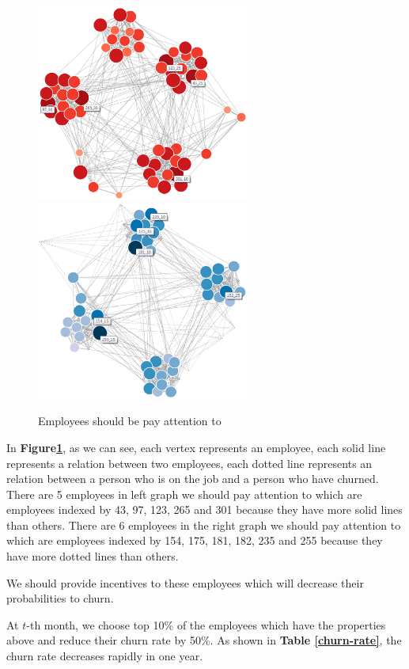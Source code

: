 \documentclass[12pt,a4paper,titlepage]{article}
\begin{document}
\begin{figure}[htb]
  \centering
  \includegraphics[width=7cm]{p1.eps}
  \includegraphics[width=7cm]{p2.eps}
  \caption{Employees should be pay attention
    to}\label{incentive-mechanism}
\end{figure}

In \textbf{Figure\ref{incentive-mechanism}}, as we can see, each vertex
represents an employee, each solid line represents a relation between two
employees, each dotted line represents an relation between a person
who is on the job and a person who have churned. There are 5
employees in left graph we should pay attention to which are employees indexed by 43, 97, 123, 265 and 301 because they have more solid lines than
others. There are 6 employees in the right graph we should pay
attention to which are employees indexed by 154, 175, 181, 182, 235 and 255 because they
have more dotted lines than others.

We should provide incentives to these employees which will decrease their
probabilities to churn.

At $t$-th month, we choose top 10\% of the employees which have the
properties above and reduce their churn rate by 50\%. As shown in
\textbf{Table \ref{churn-rate}}, the churn rate decreases rapidly in one year.
\end{document}
